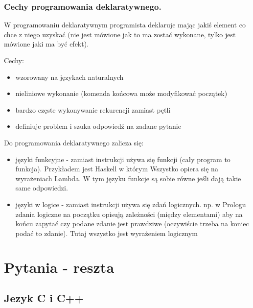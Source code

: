\documentclass[a4paper,12pt,oneside]{book}
\begin{document}
			\newpage\subsection{Cechy programowania deklaratywnego.}
				W programowaniu deklaratywnym programista deklaruje mając jakiś element co chce z
				niego uzyskać (nie jest mówione jak to ma zostać wykonane, tylko jest mówione jaki ma być
				efekt).
				
				Cechy:
				\begin{itemize}
					\item wzorowany na językach naturalnych
					\item nieliniowe wykonanie (komenda końcowa może modyfikować początek)
					\item bardzo częste wykonywanie rekurencji zamiast pętli
					\item definiuje problem i szuka odpowiedź na zadane pytanie
				\end{itemize}
			
				Do programowania deklaratywnego zalicza się:
				\begin{itemize}
					\item języki funkcyjne - zamiast instrukcji używa się funkcji (cały program to funkcja).
					Przykładem jest Haskell w którym Wszystko opiera się na wyrażeniach Lambda. W
					tym języku funkcje są sobie równe jeśli dają takie same odpowiedzi.
					\item języki w logice - zamiast instrukcji używa się zdań logicznych. np. w Prologu zdania
					logiczne na początku opisują zależności (między elementami) aby na końcu zapytać
					czy podane zdanie jest prawdziwe (oczywiście trzeba na koniec podać to zdanie).
					Tutaj wszystko jest wyrażeniem logicznym
				\end{itemize}
	
	\chapter{Pytania - reszta}
	
		\section{Jezyk C i C++}
\end{document}
